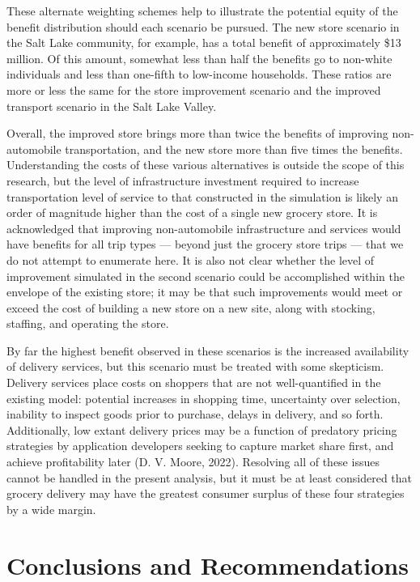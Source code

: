 \documentclass[
  letterpaper,
  number,
  review,
  3p]{elsarticle}
\begin{document}
These alternate weighting schemes help to illustrate the potential
equity of the benefit distribution should each scenario be pursued. The
new store scenario in the Salt Lake community, for example, has a total
benefit of approximately \$13 million. Of this amount, somewhat less
than half the benefits go to non-white individuals and less than
one-fifth to low-income households. These ratios are more or less the
same for the store improvement scenario and the improved transport
scenario in the Salt Lake Valley.

Overall, the improved store brings more than twice the benefits of
improving non-automobile transportation, and the new store more than
five times the benefits. Understanding the costs of these various
alternatives is outside the scope of this research, but the level of
infrastructure investment required to increase transportation level of
service to that constructed in the simulation is likely an order of
magnitude higher than the cost of a single new grocery store. It is
acknowledged that improving non-automobile infrastructure and services
would have benefits for all trip types --- beyond just the grocery store
trips --- that we do not attempt to enumerate here. It is also not clear
whether the level of improvement simulated in the second scenario could
be accomplished within the envelope of the existing store; it may be
that such improvements would meet or exceed the cost of building a new
store on a new site, along with stocking, staffing, and operating the
store.

By far the highest benefit observed in these scenarios is the increased
availability of delivery services, but this scenario must be treated
with some skepticism. Delivery services place costs on shoppers that are
not well-quantified in the existing model: potential increases in
shopping time, uncertainty over selection, inability to inspect goods
prior to purchase, delays in delivery, and so forth. Additionally, low
extant delivery prices may be a function of predatory pricing strategies
by application developers seeking to capture market share first, and
achieve profitability later (D. V. Moore, 2022). Resolving all of these
issues cannot be handled in the present analysis, but it must be at
least considered that grocery delivery may have the greatest consumer
surplus of these four strategies by a wide margin.


\section{Conclusions and Recommendations}\label{sec-conclude}
\end{document}

